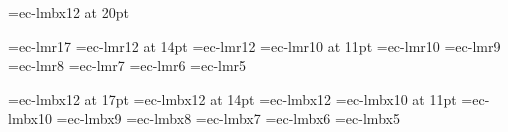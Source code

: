 
%

\def\Font #1@#2pt{\font\Fonteol=ec#1 at #2pt\Fonteol}

\font\LD@Font@Book=ec-lmbx12 at 20pt%

%
% 
%
%


% 

\font\seventeenrm=ec-lmr17%
\font\fourteenrm=ec-lmr12 at 14pt%
\font\twelverm=ec-lmr12%
\font\elevenrm=ec-lmr10 at 11pt%
\font\tenrm=ec-lmr10%
\font\ninerm=ec-lmr9%
\font\eightrm=ec-lmr8%
\font\sevenrm=ec-lmr7%
\font\sixrm=ec-lmr6%
\font\fiverm=ec-lmr5%

% 

\font\seventeenbf=ec-lmbx12 at 17pt%
\font\fourteenbf=ec-lmbx12 at 14pt%
\font\twelvebf=ec-lmbx12%
\font\elevenbf=ec-lmbx10 at 11pt%
\font\tenbf=ec-lmbx10%
\font\ninebf=ec-lmbx9%
\font\eightbf=ec-lmbx8%
\font\sevenbf=ec-lmbx7%
\font\sixbf=ec-lmbx6%
\font\fivebf=ec-lmbx5%


